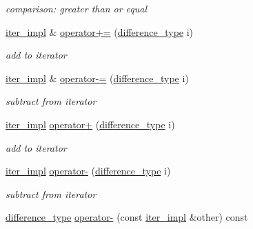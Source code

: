 \begin{DoxyCompactItemize}
\begin{DoxyCompactList}\small\item\em comparison\+: greater than or equal \end{DoxyCompactList}\item 
\mbox{\hyperlink{classnlohmann_1_1basic__json_1_1iter__impl}{iter\+\_\+impl}} \& \mbox{\hyperlink{classnlohmann_1_1basic__json_1_1iter__impl_a170970e99b7a6d124da0fffa4cb76dba}{operator+=}} (\mbox{\hyperlink{classnlohmann_1_1basic__json_1_1iter__impl_aa3d908ee643e5938d32e5f6d261d7715}{difference\+\_\+type}} i)
\begin{DoxyCompactList}\small\item\em add to iterator \end{DoxyCompactList}\item 
\mbox{\hyperlink{classnlohmann_1_1basic__json_1_1iter__impl}{iter\+\_\+impl}} \& \mbox{\hyperlink{classnlohmann_1_1basic__json_1_1iter__impl_a9fd84e884e8474c000dc966d331a4854}{operator-\/=}} (\mbox{\hyperlink{classnlohmann_1_1basic__json_1_1iter__impl_aa3d908ee643e5938d32e5f6d261d7715}{difference\+\_\+type}} i)
\begin{DoxyCompactList}\small\item\em subtract from iterator \end{DoxyCompactList}\item 
\mbox{\hyperlink{classnlohmann_1_1basic__json_1_1iter__impl}{iter\+\_\+impl}} \mbox{\hyperlink{classnlohmann_1_1basic__json_1_1iter__impl_a3b4cd7db9a93609f8e05f1759d38d633}{operator+}} (\mbox{\hyperlink{classnlohmann_1_1basic__json_1_1iter__impl_aa3d908ee643e5938d32e5f6d261d7715}{difference\+\_\+type}} i)
\begin{DoxyCompactList}\small\item\em add to iterator \end{DoxyCompactList}\item 
\mbox{\hyperlink{classnlohmann_1_1basic__json_1_1iter__impl}{iter\+\_\+impl}} \mbox{\hyperlink{classnlohmann_1_1basic__json_1_1iter__impl_a926f2f9189403e72e4f694a06d4d021a}{operator-\/}} (\mbox{\hyperlink{classnlohmann_1_1basic__json_1_1iter__impl_aa3d908ee643e5938d32e5f6d261d7715}{difference\+\_\+type}} i)
\begin{DoxyCompactList}\small\item\em subtract from iterator \end{DoxyCompactList}\item 
\mbox{\hyperlink{classnlohmann_1_1basic__json_1_1iter__impl_aa3d908ee643e5938d32e5f6d261d7715}{difference\+\_\+type}} \mbox{\hyperlink{classnlohmann_1_1basic__json_1_1iter__impl_a3bedce4ada748251e86c7924be54e210}{operator-\/}} (const \mbox{\hyperlink{classnlohmann_1_1basic__json_1_1iter__impl}{iter\+\_\+impl}} \&other) const

\end{DoxyCompactItemize}
